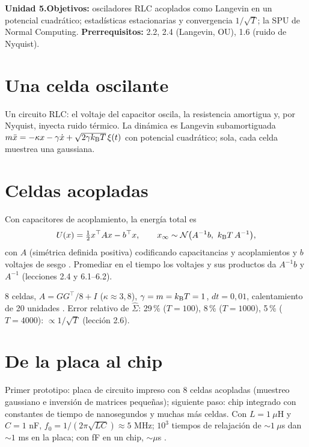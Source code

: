 \documentclass[11pt,a4paper]{article}
\begin{document}

\noindent\textbf{Unidad 5.}\quad\textbf{Objetivos:} osciladores RLC acoplados como Langevin en un potencial cuadrático; estadísticas estacionarias y
convergencia $1/\sqrt T$; la SPU de Normal Computing.
\textbf{Prerrequisitos:} 2.2, 2.4 (Langevin, OU), 1.6 (ruido de Nyquist).

\section{Una celda oscilante}
Un circuito RLC: el voltaje del capacitor oscila, la resistencia amortigua y, por Nyquist, inyecta ruido térmico. La dinámica es Langevin subamortiguada
$m\ddot x=-\kappa x-\gamma\dot x+\sqrt{2\gamma k_{\mathrm B} T}\,\xi(t)$ con potencial cuadrático; sola, cada celda muestrea una gaussiana.

\section{Celdas acopladas}
Con capacitores de acoplamiento, la energía total es
\begin{equation}
U(x)=\tfrac12x^\top Ax-b^\top x,\qquad x_\infty\sim\mathcal{N}\big(A^{-1}b,\ k_{\mathrm B} T\,A^{-1}\big),
\end{equation}
con $A$ (simétrica definida positiva) codificando capacitancias y acoplamientos y $b$ voltajes de sesgo \cite{melanson,aifer}. Promediar en el tiempo
los voltajes y sus productos da $A^{-1}b$ y $A^{-1}$ (lecciones 2.4 y 6.1--6.2).
\begin{ejemplo}
8 celdas, $A=GG^\top/8+I$ ($\kappa\approx3{,}8$), $\gamma=m=k_{\mathrm B} T=1$, $dt=0{,}01$, calentamiento de 20 unidades \evS. Error relativo de $\hat\Sigma$:
29\,\% ($T=100$), 8\,\% ($T=1000$), 5\,\% ($T=4000$): $\propto1/\sqrt T$ (lección 2.6).
\end{ejemplo}

\section{De la placa al chip}
Primer prototipo: placa de circuito impreso con 8 celdas acopladas (muestreo gaussiano e inversión de matrices pequeñas); siguiente paso: chip integrado
con constantes de tiempo de nanosegundos y muchas más celdas. Con $L=1\ \mu$H y $C=1$ nF, $f_0=1/(2\pi\sqrt{LC})\approx5$ MHz; $10^3$ tiempos de
relajación de $\sim1\ \mu$s dan $\sim1$ ms en la placa; con fF en un chip, $\sim\mu$s \evE.
\end{document}

